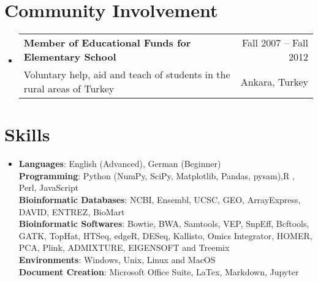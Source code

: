 \documentclass[A4,11pt]{article}
\makeatletter
\newcommand{\CVSubheading}[4]{
  \vspace{-2pt}\item
    \begin{tabular*}{0.97\textwidth}[t]{l@{\extracolsep{\fill}}r}
      \textbf{#1} & #2 \\
      \small#3 & \small #4 \\
    \end{tabular*}\vspace{-7pt}
}
\newcommand{\CVSubHeadingListStart}{\begin{itemize}[leftmargin=0.5cm, label={}]}
\newcommand{\CVSubHeadingListEnd}{\end{itemize}}
\makeatother
\begin{document}
\section{Community Involvement}
  \CVSubHeadingListStart
    \CVSubheading
      {Member of Educational Funds for Elementary School}{Fall 2007 -- Fall 2012}
      {Voluntary help, aid and teach of students in the rural areas of Turkey}{Ankara, Turkey}
  \CVSubHeadingListEnd

\begin{comment}
This section is compressed from the various skills sections that Euro CV
recommends.
\end{comment}

\section{Skills}
 \begin{itemize}[leftmargin=0.5cm, label={}]
    \item{
     \textbf{Languages}{: English (Advanced), German (Beginner)} \\
     \textbf{Programming}{: Python (NumPy, SciPy, Matplotlib, Pandas, pysam),R , Perl, JavaScript} \\
    \textbf{Bioinformatic Databases}{: NCBI, Ensembl, UCSC, GEO, ArrayExpress, DAVID, ENTREZ, BioMart} \\
    \textbf{Bioinformatic Softwares}{: Bowtie, BWA, Samtools, VEP, SnpEff, Bcftools, GATK, TopHat, HTSeq, edgeR, DESeq, Kallisto, Omics Integrator, HOMER, PCA, Plink, ADMIXTURE, EIGENSOFT and Treemix} \\    
     \textbf{Environments}{: Windows, Unix, Linux and MacOS} \\
     \textbf{Document Creation}{: Microsoft Office Suite, LaTex, Markdown, Jupyter} \\
     
    }
 \end{itemize}
    
\end{document}
